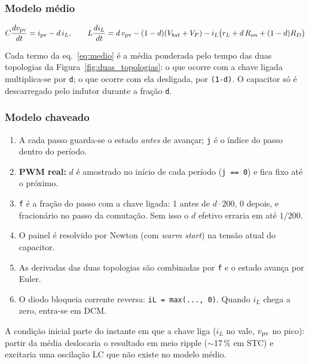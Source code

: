 \subsubsection{Modelo m\'edio}

\begin{equation}\label{eq:medio}
C\frac{dv_{\mathrm{pv}}}{dt}=i_{\mathrm{pv}}-d\,i_L,\qquad
L\frac{di_L}{dt}=d\,v_{\mathrm{pv}}-(1-d)(V_{bat}+V_F)-i_L\big(r_L+d\,R_{on}+(1-d)R_D\big)
\end{equation}


\begin{logica}
Cada termo da eq.~\eqref{eq:medio} \'e a m\'edia ponderada pelo tempo das duas topologias da
Figura~\ref{fig:duas_topologias}: o que ocorre com a chave ligada multiplica-se por \texttt{d}; o que ocorre
com ela desligada, por \texttt{(1-d)}. O capacitor s\'o \'e descarregado pelo indutor durante a fra\c{c}\~ao
\texttt{d}.
\end{logica}

\subsubsection{Modelo chaveado}


\begin{logica}
\begin{enumerate}
\item A cada passo guarda-se o estado \emph{antes} de avan\c{c}ar; \texttt{j} \'e o \'indice do passo dentro do per\'iodo.
\item \textbf{PWM real:} $d$ \'e amostrado no in\'icio de cada per\'iodo (\texttt{j == 0}) e fica fixo at\'e o pr\'oximo.
\item \texttt{f} \'e a fra\c{c}\~ao do passo com a chave ligada: 1 antes de $d\cdot200$, 0 depois, e fracion\'ario no passo da
 comuta\c{c}\~ao. Sem isso o $d$ efetivo erraria em at\'e $1/200$.
\item O painel \'e resolvido por Newton (com \emph{warm start}) na tens\~ao atual do capacitor.
\item As derivadas das duas topologias s\~ao combinadas por \texttt{f} e o estado avan\c{c}a por Euler.
\item O diodo bloqueia corrente reversa: \texttt{iL = max(..., 0)}. Quando $i_L$ chega a zero, entra-se em DCM.
\end{enumerate}
A condi\c{c}\~ao inicial parte do instante em que a chave liga ($i_L$ no vale, $v_{\mathrm{pv}}$ no pico): partir da m\'edia
deslocaria o resultado em meio ripple ($\sim$17\,\% em STC) e excitaria uma oscila\c{c}\~ao LC que n\~ao existe no modelo m\'edio.
\end{logica}


